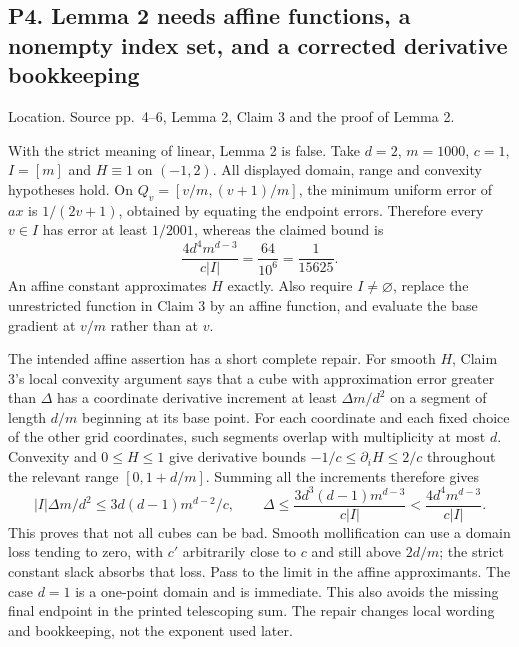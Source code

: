 \documentclass[10pt]{article}
\begin{document}
\subsection*{P4. Lemma 2 needs affine functions, a nonempty index set, and a corrected derivative bookkeeping}
Location. Source pp. 4–6, Lemma 2, Claim 3 and the proof of Lemma 2.\par
With the strict meaning of linear, Lemma 2 is false. Take \(d=2\), \(m=1000\), \(c=1\), \(I=[m]\) and \(H\equiv1\) on \((-1,2)\). All displayed domain, range and convexity hypotheses hold. On \(Q_v=[v/m,(v+1)/m]\), the minimum uniform error of \(ax\) is \(1/(2v+1)\), obtained by equating the endpoint errors. Therefore every \(v\in I\) has error at least \(1/2001\), whereas the claimed bound is \[\frac{4d^4m^{d-3}}{c|I|}=\frac{64}{10^6}=\frac1{15625}.\] An affine constant approximates \(H\) exactly. Also require \(I\ne\varnothing\), replace the unrestricted function in Claim 3 by an affine function, and evaluate the base gradient at \(v/m\) rather than at \(v\).\par
The intended affine assertion has a short complete repair. For smooth \(H\), Claim 3’s local convexity argument says that a cube with approximation error greater than \(\Delta\) has a coordinate derivative increment at least \(\Delta m/d^2\) on a segment of length \(d/m\) beginning at its base point. For each coordinate and each fixed choice of the other grid coordinates, such segments overlap with multiplicity at most \(d\). Convexity and \(0\le H\le1\) give derivative bounds \(-1/c\le\partial_iH\le2/c\) throughout the relevant range \([0,1+d/m]\). Summing all the increments therefore gives \[|I|\Delta m/d^2\le 3d(d-1)m^{d-2}/c,\qquad
 \Delta\le\frac{3d^3(d-1)m^{d-3}}{c|I|}
       <\frac{4d^4m^{d-3}}{c|I|}.\] This proves that not all cubes can be bad. Smooth mollification can use a domain loss tending to zero, with \(c'\) arbitrarily close to \(c\) and still above \(2d/m\); the strict constant slack absorbs that loss. Pass to the limit in the affine approximants. The case \(d=1\) is a one-point domain and is immediate. This also avoids the missing final endpoint in the printed telescoping sum. The repair changes local wording and bookkeeping, not the exponent used later.\par
\end{document}

